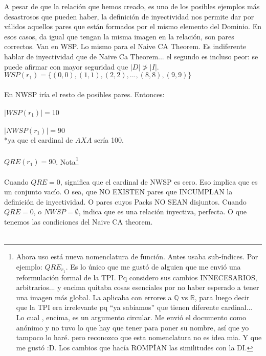 	\noindent
	A pesar de que la relación que hemos creado, es uno de los posibles ejemplos más desastrosos que pueden haber, la definición de inyectividad nos permite dar por válidos aquellos pares que están formados por el mismo elemento del Dominio. En esos casos, da igual que tengan la misma imagen en la relación, son pares correctos. Van en WSP. Lo mismo para el Naive CA Theorem. Es indiferente hablar de inyectividad que de Naive Ca Theorem... el segundo es incluso peor: se puede afirmar con mayor seguridad que $|D| \ngtr |I|$.
	\\
	
	\noindent
	$WSP(r_{1}) = \{(0,0), (1,1), (2,2), ..., (8,8), (9,9)\}$\\\\
	En NWSP iría el resto de posibles pares. Entonces:\\\\
	$|WSP(r_{1})| = 10$\\\\
	$|NWSP(r_{1})| = 90$\\
	*ya que el cardinal de $A X A$ sería 100.\\\\
	$QRE(r_{1}) = 90$. Nota\footnote{
			Ahora uso está nueva nomenclatura de función. Antes usaba sub-índices. Por ejemplo:  $QRE_{r_{1}}$. Es lo único que me gustó de alguien que me envió una reformulación formal de la TPI. Pq considero sus cambios INNECESARIOS, arbitrarios... y encima quitaba cosas esenciales por no haber esperado a tener una imagen más global. La aplicaba con errores a $\mathbb{Q}$ vs $\mathbb{R}$, para luego decir que la TPI era irrelevante pq ``ya sabíamos'' que tienen diferente cardinal...  Lo cual , encima, es un argumento circular. Me envió el documento como anónimo y no tuvo lo que hay que tener para poner su nombre, así que yo tampoco lo haré. pero reconozco que esta nomenclatura no es idea mia. Y que me gustó :D. Los cambios que hacía ROMPÍAN las similitudes con la DI.
	}
	\\\\
	
	\noindent
	Cuando $QRE=0$, significa que el cardinal de NWSP es cero. Eso implica que es un conjunto vacío. O sea, que NO EXISTEN pares que INCUMPLAN la definición de inyectividad. O pares cuyos Packs NO SEAN disjuntos. Cuando $QRE=0$, o $NWSP=\emptyset$, indica que es una relación inyectiva, perfecta. O que tenemos las condiciones del Naive CA theorem.
	\\\\
	
